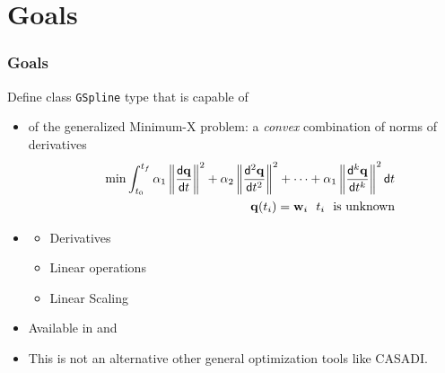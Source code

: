 \section{Goals}

\begin{frame}[t]
	\frametitle{Goals}

	\vfill
	{\fontsize{10}{6}
		Define class \texttt{GSpline} type that is capable of
		\begin{itemize}
			\item {} of the generalized  Minimum-X problem: a \emph{convex} combination of norms of derivatives
			      \begin{eqnarray*}
				      &&\min \int_{t_0}^{t_f} \alpha_1 \left\|\frac{\mathsf{d} \mathbf{q}}{\mathsf{d} t}\right\|^2 + \alpha_2 \left\|\frac{\mathsf{d}^{2} \mathbf{q}}{\mathsf{d} t^{2}}\right\|^2 + \cdots  + \alpha_1 \left\|\frac{\mathsf{d}^{k} \mathbf{q}}{\mathsf{d} t^{k}} \right\|^2 \mathsf{d} t \\
				      &&\mathbf{q}(t_i) = \mathbf{w}_i \ \ t_i\ \text{ is unknown}
			      \end{eqnarray*}
			\item {}
			      \begin{itemize}
				      \item Derivatives
				      \item Linear operations
				      \item Linear Scaling
			      \end{itemize}
			\item Available in  and 
			\item {} This is not an alternative other general optimization tools like CASADI.
		\end{itemize}
	}
	\vfill
\end{frame}


